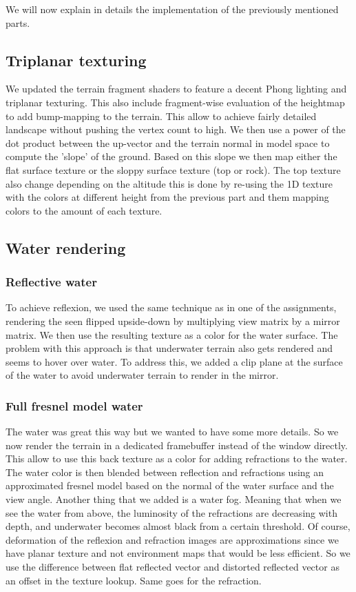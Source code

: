 \documentclass[11pt]{article}
\begin{document}
We will now explain in details the implementation of the previously mentioned
parts. 

\subsection{Triplanar texturing}

We updated the terrain fragment shaders to feature a decent Phong lighting and
triplanar texturing. This also include fragment-wise evaluation of the heightmap
to add bump-mapping to the terrain. This allow to achieve fairly detailed
landscape without pushing the vertex count to high. We then use a power of the
dot product between the up-vector and the terrain normal in model space to
compute the 'slope' of the ground. Based on this slope we then map either the
flat surface texture or the sloppy surface texture (top or rock). The top
texture also change depending on the altitude this is done by re-using the 1D
texture with the colors at different height from the previous part and them
mapping colors to the amount of each texture.

\subsection{Water rendering}

\subsubsection{Reflective water}

To achieve reflexion, we used the same technique as in one of the assignments,
rendering the seen flipped upside-down by multiplying view matrix by a mirror
matrix. We then use the resulting texture as a color for the water surface. The
problem with this approach is that underwater terrain also gets rendered and
seems to hover over water. To address this, we added a clip plane at the surface
of the water to avoid underwater terrain to render in the mirror. 

\subsubsection{Full fresnel model water}

The water was great this way but we wanted to have some more details. So we now
render the terrain in a dedicated framebuffer instead of the window directly.
This allow to use this back texture as a color for adding refractions to  the
water. The water color is then blended between reflection and refractions using
an approximated fresnel model based on the normal of the water surface and the
view angle. Another thing that we added is a water fog. Meaning that when we see
the water from above, the luminosity of the refractions are decreasing with
depth, and underwater becomes almost black from a certain threshold. Of course,
deformation of the reflexion and refraction images are approximations since we
have planar texture and not environment maps that would be less efficient. So
we use the difference between flat reflected vector and distorted reflected
vector as an offset in the texture lookup. Same goes for the refraction.
\end{document}
